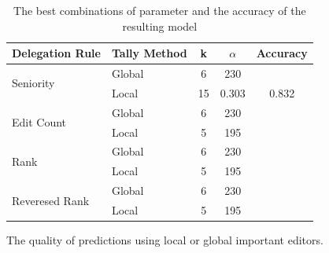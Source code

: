 \begin{table}
    \centering
    \begin{tabular}{@{\extracolsep{\fill}}llccc}
        \toprule
        Delegation Rule & Tally Method & k & $\alpha$ & Accuracy \\ \midrule
        \multirow{2}{*}{Seniority} & Global & 6 & 230  \\ 
        \cmidrule{2-5}
        & Local & 15 & 0.303& 0.832  \\
        \midrule
        \multirow{2}{*}{Edit Count} & Global & 6 & 230  \\
        \cmidrule{2-5}
        & Local & 5 & 195  \\
        \midrule
        \multirow{2}{*}{Rank} & Global & 6 & 230  \\
        \cmidrule{2-5}
        & Local & 5 & 195  \\
        \midrule
        \multirow{2}{*}{Reveresed Rank} & Global & 6 & 230  \\
        \cmidrule{2-5}
        & Local & 5 & 195  \\
        \bottomrule
        \end{tabular}
        \caption{The best combinations of parameter and the accuracy of the resulting model}
        \label{tab:grid-search}
\end{table}

The quality of predictions using local or global important editors.